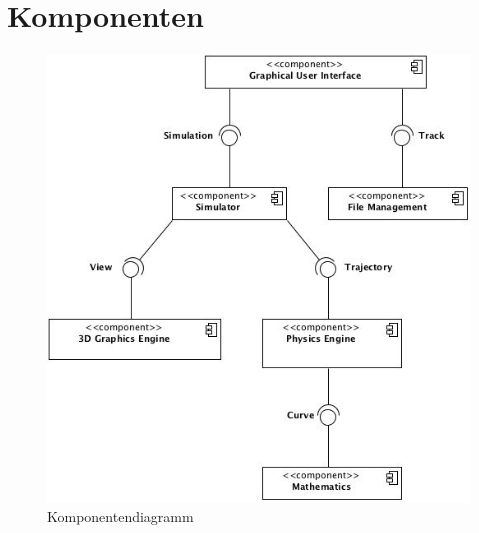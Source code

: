 \chapter{Komponenten}

\begin{figure}[!h]
	\includegraphics[width=\linewidth]{bilder/component_overview}
	\caption{Komponentendiagramm}
\end{figure}